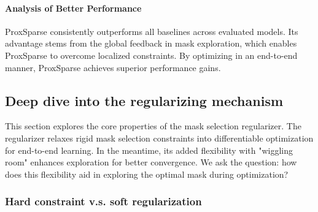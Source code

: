 \paragraph{Analysis of Better Performance} ProxSparse consistently outperforms all baselines across evaluated models. Its advantage stems from the global feedback in mask exploration, which enables ProxSparse to overcome localized constraints. By optimizing in an end-to-end manner, ProxSparse achieves superior performance gains.

\subsection{Deep dive into the regularizing mechanism}

This section explores the core properties of the mask selection regularizer. The regularizer relaxes rigid mask selection constraints into differentiable optimization for end-to-end learning. In the meantime, its added flexibility with "wiggling room" enhances exploration for better convergence. We ask the question: how does this flexibility aid in exploring the optimal mask during optimization?


\subsubsection{Hard constraint v.s. soft regularization}

